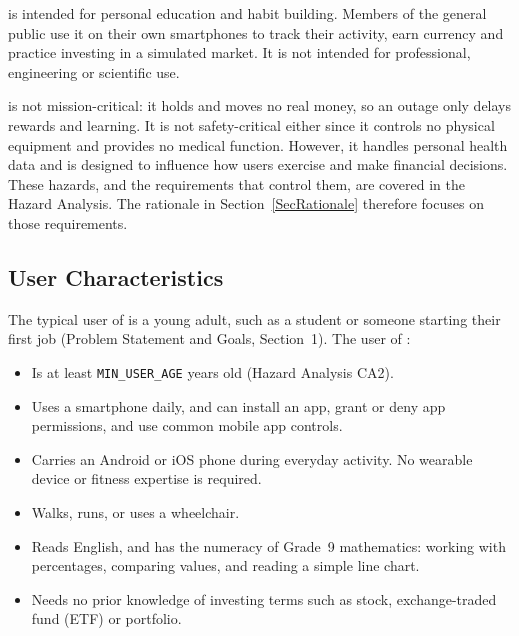 \documentclass[12pt]{article}
\begin{document}
\progname{} is intended for personal education and habit building. Members of
the general public use it on their own smartphones to track their activity,
earn currency and practice investing in a simulated market. It is not intended
for professional, engineering or scientific use.

\progname{} is not mission-critical: it holds and moves no real money, so an
outage only delays rewards and learning. It is not safety-critical either
since it controls no physical equipment and provides
no medical function. However, it handles personal health data and
is designed to influence how users exercise and make financial decisions. These
hazards, and the requirements that control them, are covered in the Hazard
Analysis. The rationale in Section~\ref{SecRationale} therefore focuses on
those requirements.

\subsection{User Characteristics} \label{SecUserCharacteristics}


The typical user of \progname{} is a young adult, such as a student or someone
starting their first job (Problem Statement and Goals, Section~1). The user of
\progname{}:
\begin{itemize}
  \item Is at least \texttt{MIN\_USER\_AGE} years old (Hazard Analysis CA2).
  \item Uses a smartphone daily, and can install an app, grant or deny app
  permissions, and use common mobile app controls.
  \item Carries an Android or iOS phone during everyday activity. No wearable
  device or fitness expertise is required.
  \item Walks, runs, or uses a wheelchair.
  \item Reads English, and has the numeracy of Grade~9 mathematics: working
  with percentages, comparing values, and reading a simple line chart.
  \item Needs no prior knowledge of investing terms such as stock,
  exchange-traded fund (ETF) or portfolio.
\end{itemize}
\end{document}
